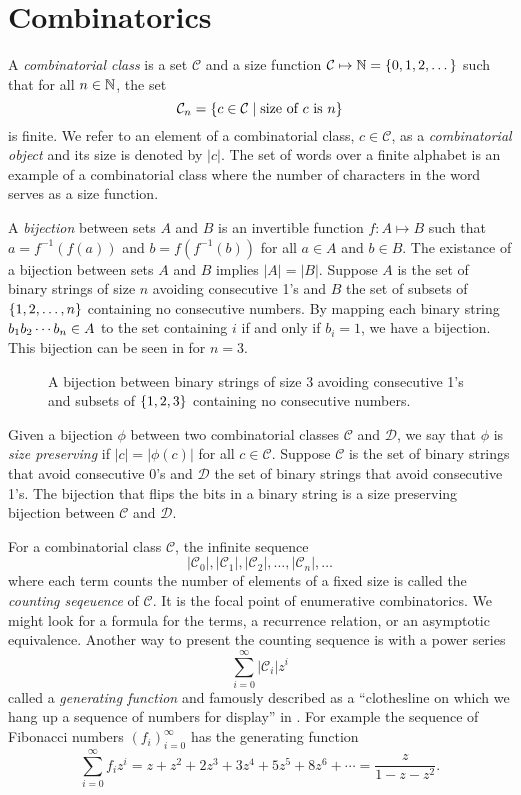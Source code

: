 \label{ch:backgr}
\section{Combinatorics\label{sec:combinatorics}}
A \emph{combinatorial class} is a set $\mathcal{C}$ and a size function $\mathcal{C} \mapsto \mathbb{N} = \left\{0,1,2,\dotsc\right\}$ such that for all $n\in\mathbb{N}$, the set
\[
    \mathcal{C}_n = \left\{c \in \mathcal{C} \mid \text{size of $c$ is $n$}\right\}
\]
is finite. We refer to an element of a combinatorial class, $c\in\mathcal{C}$, as a \emph{combinatorial object} and its size is denoted by $|c|$. The set of words over a finite alphabet is an example of a combinatorial class where the number of characters in the word serves as a size function.

A \emph{bijection} between sets $A$ and $B$ is an invertible function $f: A \mapsto B$ such that $a=f^{-1}(f(a))$ and $b=f(f^{-1}(b))$ for all $a\in A$ and $b \in B$. The existance of a bijection between sets $A$ and $B$ implies $|A|=|B|$. Suppose $A$ is the set of binary strings of size $n$ avoiding consecutive 1's and $B$ the set of subsets of $\left\{1,2,\dotsc,n\right\}$ containing no consecutive numbers. By mapping each binary string $b_1 b_2 \dotsm b_{n} \in A$ to the set containing $i$ if and only if $b_i=1$, we have a bijection. This bijection can be seen in  for $n=3$.

\begin{figure}[htbp]
    \centering
    
    \caption{A bijection between binary strings of size 3 avoiding consecutive 1's and subsets of $\left\{1,2,3\right\}$ containing no consecutive numbers.}
    \label{fig:bijection_example}
\end{figure}

Given a bijection $\phi$ between two combinatorial classes $\mathcal{C}$ and $\mathcal{D}$, we say that $\phi$ is \emph{size preserving} if $|c| = |\phi(c)|$ for all $c\in\mathcal{C}$. Suppose $\mathcal{C}$ is the set of binary strings that avoid consecutive 0's and $\mathcal{D}$ the set of binary strings that avoid consecutive 1's. The bijection that flips the bits in a binary string is a size preserving bijection between $\mathcal{C}$ and $\mathcal{D}$. 

For a combinatorial class $\mathcal{C}$, the infinite sequence 
\[
    |\mathcal{C}_0|, |\mathcal{C}_1|, |\mathcal{C}_2|,\dotsc,|\mathcal{C}_n|,\dotsc
\]
where each term counts the number of elements of a fixed size is called the \emph{counting seqeuence} of $\mathcal{C}$. It is the focal point of enumerative combinatorics. We might look for a formula for the terms, a recurrence relation, or an asymptotic equivalence. Another way to present the counting sequence is with a power series
\[
    \sum_{i=0}^\infty |\mathcal{C}_i|z^i
\]
called a \emph{generating function} and famously described as a ``clothesline on which we hang up a sequence of numbers for display'' in . For example the sequence of Fibonacci numbers $\left(f_i\right)_{i=0}^\infty$ has the generating function
\[
    \sum_{i=0}^\infty f_iz^i =  z + z^2 + 2z^3 + 3z^4 + 5z^5 + 8z^6 + \dotsb = \frac{z}{1-z-z^2}.
\]

